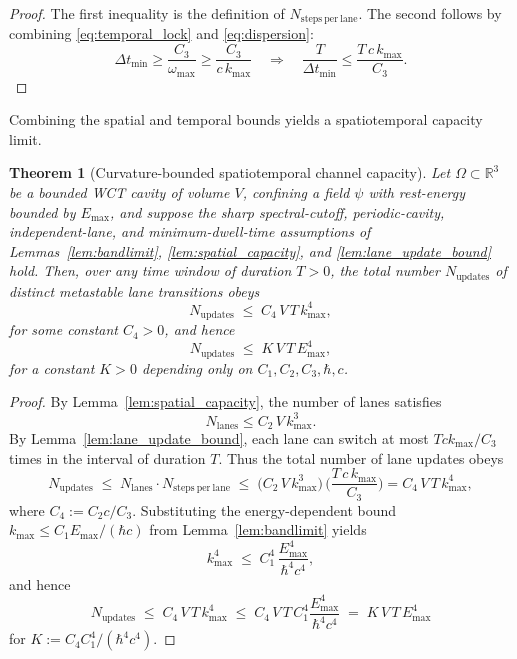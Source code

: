 \documentclass[12pt]{article}
\newtheorem{theorem}{Theorem}[section]
\begin{document}
\begin{proof}
The first inequality is the definition of $N_{\mathrm{steps\ per\ lane}}$. The second follows by combining \eqref{eq:temporal_lock} and \eqref{eq:dispersion}:
\[
\Delta t_{\min} \ge \frac{C_3}{\omega_{\max}}
\ge \frac{C_3}{c\,k_{\max}}
\quad\Longrightarrow\quad
\frac{T}{\Delta t_{\min}} \le \frac{T\,c\,k_{\max}}{C_3}.
\]
\end{proof}

Combining the spatial and temporal bounds yields a spatiotemporal capacity limit.

\begin{theorem}[Curvature-bounded spatiotemporal channel capacity]
\label{thm:spacetime_capacity}
Let $\Omega \subset \mathbb{R}^3$ be a bounded WCT cavity of volume $V$, confining a field $\psi$ with rest-energy bounded by $E_{\max}$, and suppose the sharp spectral-cutoff, periodic-cavity, independent-lane,
and minimum-dwell-time assumptions of
Lemmas~\ref{lem:bandlimit}, \ref{lem:spatial_capacity}, and
\ref{lem:lane_update_bound} hold. Then, over any time window of duration $T > 0$, the total number $N_{\mathrm{updates}}$ of distinct metastable lane transitions obeys
\begin{equation}
  \label{eq:Nupdates_kmax}
  N_{\mathrm{updates}} \;\le\; C_4\,V\,T\,k_{\max}^4,
\end{equation}
for some constant $C_4 > 0$, and hence
\begin{equation}
  \label{eq:Nupdates_energy}
  N_{\mathrm{updates}} \;\le\; K\,V\,T\,E_{\max}^4,
\end{equation}
for a constant $K > 0$ depending only on $C_1,C_2,C_3,\hbar,c$.
\end{theorem}

\begin{proof}
By Lemma~\ref{lem:spatial_capacity}, the number of lanes satisfies
\[
N_{\mathrm{lanes}} \le C_2\,V\,k_{\max}^3.
\]
By Lemma~\ref{lem:lane_update_bound}, each lane can switch at most $T c k_{\max}/C_3$ times in the interval of duration $T$. Thus the total number of lane updates obeys
\[
N_{\mathrm{updates}}
\;\le\; N_{\mathrm{lanes}} \cdot N_{\mathrm{steps\ per\ lane}}
\;\le\; \Big(C_2\,V\,k_{\max}^3\Big)\,\Big(\frac{T\,c\,k_{\max}}{C_3}\Big)
= C_4\,V\,T\,k_{\max}^4,
\]
where $C_4 := C_2 c / C_3$. Substituting the energy-dependent bound $k_{\max} \le C_1 E_{\max} / (\hbar c)$ from Lemma~\ref{lem:bandlimit} yields
\[
k_{\max}^4 \;\le\; C_1^4 \,\frac{E_{\max}^4}{\hbar^4 c^4},
\]
and hence
\[
N_{\mathrm{updates}} \;\le\; C_4\,V\,T\,k_{\max}^4
\;\le\; C_4\,V\,T\,C_1^4 \frac{E_{\max}^4}{\hbar^4 c^4}
\;=\; K\,V\,T\,E_{\max}^4
\]
for $K := C_4 C_1^4 / (\hbar^4 c^4)$.
\end{proof}
\end{document}
